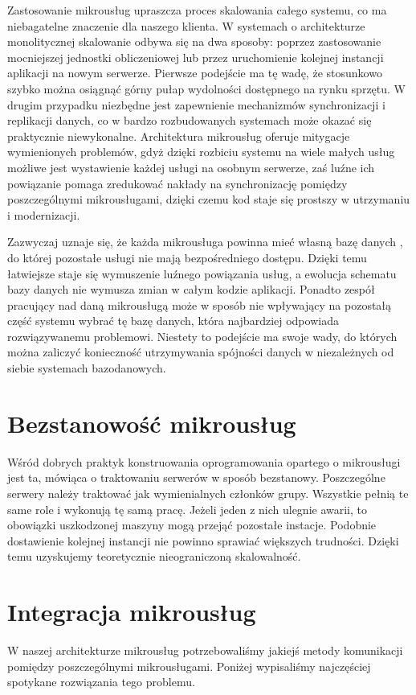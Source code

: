 \documentclass[licencjacka]{pracamgr}
\begin{document}
Zastosowanie mikrousług upraszcza proces skalowania całego systemu, co ma niebagatelne
znaczenie dla naszego klienta. W systemach o architekturze monolitycznej skalowanie
odbywa się na dwa sposoby: poprzez zastosowanie mocniejszej jednostki obliczeniowej
lub przez uruchomienie kolejnej instancji aplikacji na nowym serwerze. Pierwsze
podejście ma tę wadę, że stosunkowo szybko można osiągnąć górny pułap wydolności
dostępnego na rynku sprzętu. W drugim przypadku niezbędne jest zapewnienie mechanizmów
synchronizacji i replikacji danych, co w bardzo rozbudowanych systemach może okazać się
praktycznie niewykonalne. Architektura mikrousług oferuje mitygacje wymienionych problemów,
gdyż dzięki rozbiciu systemu na wiele małych usług możliwe jest
wystawienie każdej usługi na osobnym serwerze, zaś luźne ich powiązanie pomaga
zredukować nakłady na synchronizację pomiędzy poszczególnymi mikrousługami, dzięki
czemu kod staje się prostszy w utrzymaniu i modernizacji.

Zazwyczaj uznaje się, że każda mikrousługa powinna mieć własną bazę danych \cite{nginx},
do której pozostałe usługi nie mają bezpośredniego dostępu. Dzięki temu łatwiejsze
staje się wymuszenie luźnego powiązania usług, a ewolucja schematu bazy danych nie
wymusza zmian w całym kodzie aplikacji. Ponadto zespół pracujący nad daną mikrousługą
może w sposób nie wpływający na pozostałą część systemu wybrać tę bazę danych, która
najbardziej odpowiada rozwiązywanemu problemowi. Niestety to podejście ma swoje wady,
do których można zaliczyć konieczność utrzymywania spójności danych w niezależnych
od siebie systemach bazodanowych.

\section{Bezstanowość mikrousług}

Wśród dobrych praktyk konstruowania oprogramowania opartego o mikrousługi \cite{nginx}
jest ta, mówiąca o traktowaniu serwerów w sposób bezstanowy. Poszczególne serwery
należy traktować jak wymienialnych członków grupy. Wszystkie pełnią te same role i
wykonują tę samą pracę. Jeżeli jeden z nich ulegnie awarii, to obowiązki uszkodzonej
maszyny mogą przejąć pozostałe instacje. Podobnie dostawienie kolejnej instancji
nie powinno sprawiać większych trudności. Dzięki temu uzyskujemy teoretycznie
nieograniczoną skalowalność.

\section{Integracja mikrousług}
W naszej architekturze mikrousług potrzebowaliśmy jakiejś metody komunikacji
pomiędzy poszczególnymi mikrousługami. Poniżej wypisaliśmy najczęściej spotykane
rozwiązania tego problemu.
\end{document}
